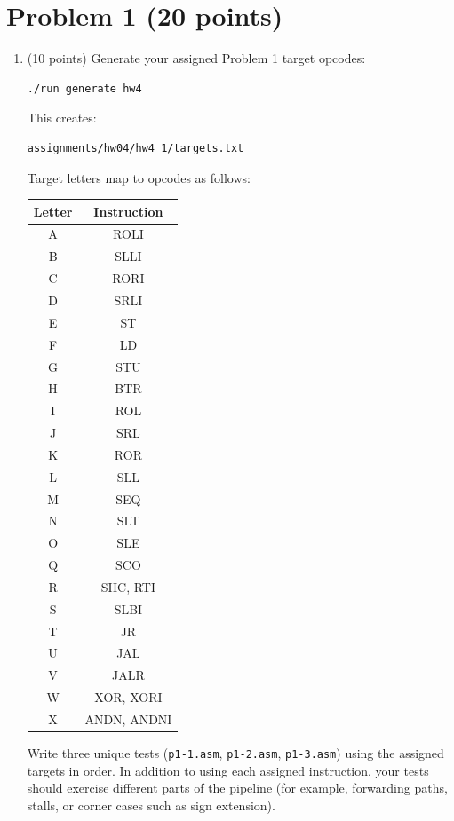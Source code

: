 \documentclass[12pt]{article}
\begin{document}
\section*{Problem 1 (20 points)}
\begin{enumerate}
\item (10 points)
Generate your assigned Problem 1 target opcodes:
\begin{verbatim}
./run generate hw4
\end{verbatim}
This creates:
\begin{verbatim}
assignments/hw04/hw4_1/targets.txt
\end{verbatim}
Target letters map to opcodes as follows:
\begin{center}
\begin{tabular}{|c|c|}  \hline
Letter & Instruction \\ \hline
A & ROLI \\ \hline
B & SLLI \\ \hline
C & RORI \\ \hline
D & SRLI \\ \hline
E & ST \\ \hline
F & LD \\ \hline
G & STU \\ \hline
H & BTR \\ \hline
I & ROL \\ \hline
J & SRL \\ \hline
K & ROR \\ \hline
L & SLL \\ \hline
M & SEQ \\ \hline
N & SLT \\ \hline
O & SLE \\ \hline
Q & SCO \\ \hline
R & SIIC, RTI \\ \hline
S & SLBI \\ \hline
T & JR \\ \hline
U & JAL \\ \hline
V & JALR \\ \hline
W & XOR, XORI \\ \hline
X & ANDN, ANDNI \\ \hline
\end{tabular}
\end{center}

Write three unique tests (\texttt{p1-1.asm}, \texttt{p1-2.asm}, \texttt{p1-3.asm}) using the assigned targets in order. In addition to using each assigned instruction, your tests should exercise different parts of the pipeline (for example, forwarding paths, stalls, or corner cases such as sign extension).


\end{enumerate}
\end{document}
